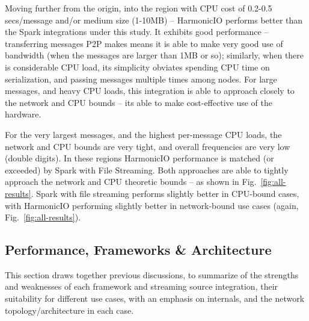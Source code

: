\documentclass[conference]{IEEEtran}
\begin{document}

Moving further from the origin, into the region with CPU cost of 0.2-0.5 secs/message and/or medium size (1-10MB) -- HarmonicIO performs better than the Spark integrations under this study. 
It exhibits good performance -- transferring messages P2P makes means it is able to make very good use of bandwidth (when the messages are larger than 1MB or so); similarly, when there is considerable CPU load, its simplicity obviates spending CPU time on serialization, and passing messages multiple times among nodes. %
For large messages, and heavy CPU loads, this integration is able to approach closely to the network and CPU bounds -- its able to make cost-effective use of the hardware.

For the very largest messages, and the highest per-message CPU loads, the network and CPU bounds are very tight, and overall frequencies are very low (double digits). In these regions HarmonicIO performance is matched (or exceeded) by Spark with File Streaming. Both approaches are able to tightly approach the network and CPU theoretic bounds -- as shown in Fig.~\ref{fig:all-results}. Spark with file streaming performs slightly better in CPU-bound cases, with HarmonicIO performing slightly better in network-bound use cases (again, Fig.~\ref{fig:all-results}). 

\subsection{Performance, Frameworks \& Architecture}

This section draws together previous discussions, to summarize of the strengths and weaknesses of each framework and streaming source integration, their suitability for different use cases, with an emphasis on internals, and the network topology/architecture in each case. 
\end{document}

